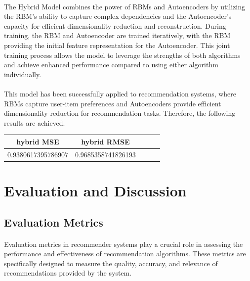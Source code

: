\documentclass{cup-pan}
\begin{document}
\paragraph{}
The Hybrid Model combines the power of RBMs and Autoencoders by utilizing the RBM's ability to capture complex dependencies and the Autoencoder's capacity for efficient dimensionality reduction and reconstruction. During training, the RBM and Autoencoder are trained iteratively, with the RBM providing the initial feature representation for the Autoencoder. This joint training process allows the model to leverage the strengths of both algorithms and achieve enhanced performance compared to using either algorithm individually.
\paragraph{}
This model has been successfully applied to recommendation systems, where RBMs capture user-item preferences and Autoencoders provide efficient dimensionality reduction for recommendation tasks. Therefore, the following results are achieved.

\begin{center}
  \begin{tabular}{||c|c|c|c|c||}
    \hline\hline 
    \textbf{hybrid MSE} & \textbf{hybrid RMSE} \\
    \hline 
    0.9380617395786907 &  0.9685358741826193  \\
    \hline\hline
  \end{tabular}  
\end{center}

\section{Evaluation and Discussion}
\label{sec:overview}
\paragraph{}
\subsection{Evaluation Metrics}
\paragraph{}
Evaluation metrics in recommender systems play a crucial role in assessing the performance and effectiveness of recommendation algorithms. These metrics are specifically designed to measure the quality, accuracy, and relevance of recommendations provided by the system.
\end{document}
